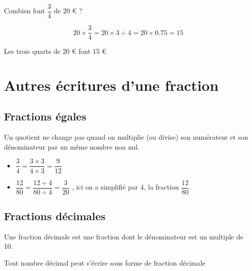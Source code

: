 \documentclass[12pt,a4paper]{article}
\begin{document}
\begin{myex}
	Combien font $\dfrac{3}{4}$ de 20 € ?
	
	\begin{equation*}
		20 \times \dfrac{3}{4} = 20 \times 3 \div 4 = 20 \times \num{0.75} = 15
	\end{equation*}

	Les trois quarts de 20 € font 15 €
\end{myex}


\section{Autres écritures d'une fraction}

\subsection{Fractions égales}

\begin{myprop}
	Un quotient ne change pas quand on multiplie (ou divise) son numérateur et son dénominateur par un même nombre non nul.
\end{myprop}


\begin{myexs}
	\begin{itemize}
		\item $\dfrac{3}{4} = \dfrac{3 \times 3}{4 \times 3} = \dfrac{9}{12}$ 
		\item $\dfrac{12}{80} = \dfrac{12 \div 4}{80 \div 4} = \dfrac{3}{20}$ , ici on  a simplifié par 4, la fraction $\dfrac{12}{80}$.
	\end{itemize}
\end{myexs}

\subsection{Fractions décimales}

\begin{mydef}
	Une fraction décimale est une fraction dont le dénominateur est un multiple de 10.
\end{mydef}

\begin{myprop}
	Tout nombre décimal peut s'écrire sous forme de fraction décimale
\end{myprop}
\end{document}
